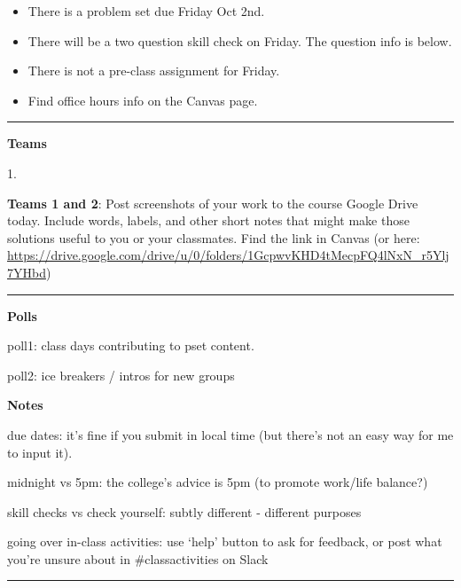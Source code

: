 \documentclass[12pt,letterpaper,noanswers]{exam}
\begin{document}
 \pdfpageheight 11in 
  \pdfpagewidth 8.5in

\noindent 





\begin{itemize}
\itemsep0em
    \item There is a problem set due Friday Oct 2nd.
    \item There will be a two question skill check on Friday.  The question info is below.
    \item There is not a pre-class assignment for Friday.
    \item Find office hours info on the Canvas page.
\end{itemize}

\hrule
\vspace{0.2cm}





\noindent\textbf{Teams}

\begin{multicols}{2}
1. 

\end{multicols}

\noindent \textbf{Teams 1 and 2}: Post screenshots of your work to the course Google Drive today.  Include words, labels, and other short notes that might make those solutions useful to you or your classmates.  Find the link in Canvas (or here: \url{https://drive.google.com/drive/u/0/folders/1GcpwvKHD4tMecpFQ4lNxN_r5Ylj7YHbd})

\vspace{0.2cm}
\hrule
\vspace{0.2cm}

\noindent\textbf{Polls}

poll1: class days contributing to pset content.

poll2: ice breakers / intros for new groups

\noindent\textbf{Notes}

due dates: it's fine if you submit in local time (but there's not an easy way for me to input it).

midnight vs 5pm: the college's advice is 5pm (to promote work/life balance?)

skill checks vs check yourself: subtly different - different purposes

going over in-class activities: use `help' button to ask for feedback, or post what you're unsure about in \#classactivities on Slack
\vspace{0.2cm}
\hrule
\vspace{0.2cm}
\end{document}
